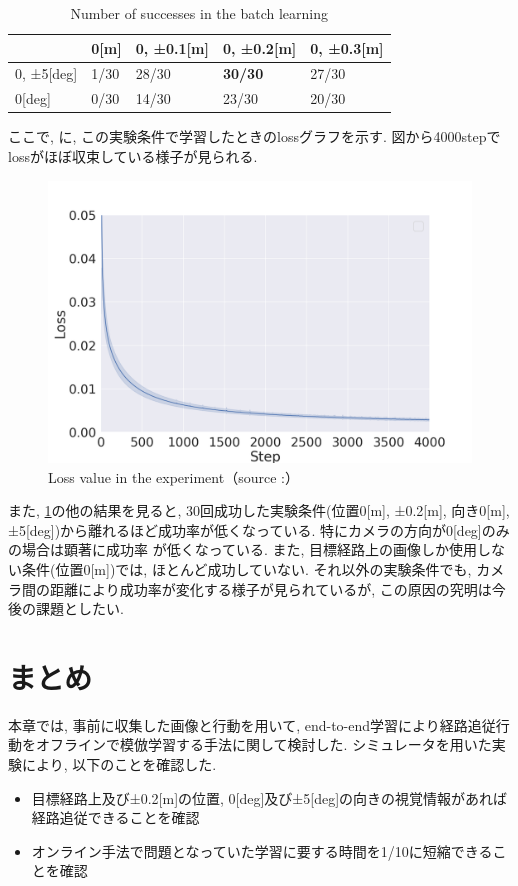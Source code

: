 \begin{table}[h]
  \centering
  \caption{Number of successes in the batch learning}
  \begin{tabular}{|p{2cm}|p{2cm}|p{2cm}|p{2cm}|p{2cm}|} \hline
     & 0[m] & 0, ±0.1[m] & 0, ±0.2[m] & 0, ±0.3[m] \\ \hline
    0, ±5[deg] & 1/30 & 28/30 & \bf30/30 & 27/30 \\ \hline
    0[deg] & 0/30 & 14/30 & 23/30 & 20/30 \\ \hline
  \end{tabular}
  \label{tb:exp1}
\end{table}

ここで, に, この実験条件で学習したときのlossグラフを示す. 図から4000stepでlossがほぼ収束している様子が見られる. 

\newpage
\begin{figure}[h]
  \centering
  \includegraphics[keepaspectratio, scale=0.35]{images/loss_00_02_4000.png}
  \caption{Loss value in the experiment（source :\cite{offline}）}
  \label{Fig:loss_00_02_4000}
  \end{figure}

また, \ref{tb:exp1}の他の結果を見ると, 30回成功した実験条件(位置0[m], ±0.2[m], 向き0[m], ±5[deg])から離れるほど成功率が低くなっている. 特にカメラの方向が0[deg]のみの場合は顕著に成功率
が低くなっている. また, 目標経路上の画像しか使用しない条件(位置0[m])では, ほとんど成功していない. それ以外の実験条件でも, カメラ間の距離により成功率が変化する様子が見られているが, この原因の究明は今後の課題としたい. 

\section{まとめ}
本章では, 事前に収集した画像と行動を用いて, end-to-end学習により経路追従行動をオフラインで模倣学習する手法に関して検討した. シミュレータを用いた実験により, 以下のことを確認した. 

\begin{itemize}
  \item 目標経路上及び±0.2[m]の位置, 0[deg]及び±5[deg]の向きの視覚情報があれば経路追従できることを確認
  \item オンライン手法で問題となっていた学習に要する時間を1/10に短縮できることを確認
\end{itemize}
